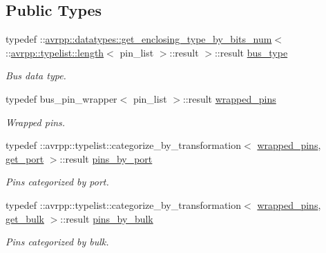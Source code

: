 \subsection*{Public Types}
\begin{DoxyCompactItemize}
\item 
typedef ::\hyperlink{structavrpp_1_1datatypes_1_1get__enclosing__type__by__bits__num}{avrpp::datatypes::get\_\-enclosing\_\-type\_\-by\_\-bits\_\-num}$<$ ::\hyperlink{structavrpp_1_1typelist_1_1length}{avrpp::typelist::length}$<$ pin\_\-list $>$::result $>$::result \hyperlink{structavrpp_1_1bus_1_1output__bus_a02bf22de8447c8097a3c77e0f896a3b4}{bus\_\-type}
\begin{DoxyCompactList}\small\item\em Bus data type. \item\end{DoxyCompactList}\item 
typedef bus\_\-pin\_\-wrapper$<$ pin\_\-list $>$::result \hyperlink{structavrpp_1_1bus_1_1output__bus_a80cbab4a94f1c05bf8e0f133a59a7fbb}{wrapped\_\-pins}
\begin{DoxyCompactList}\small\item\em Wrapped pins. \item\end{DoxyCompactList}\item 
typedef ::avrpp::typelist::categorize\_\-by\_\-transformation$<$ \hyperlink{structavrpp_1_1bus_1_1output__bus_a80cbab4a94f1c05bf8e0f133a59a7fbb}{wrapped\_\-pins}, \hyperlink{structavrpp_1_1bus_1_1get__port}{get\_\-port} $>$::result \hyperlink{structavrpp_1_1bus_1_1output__bus_a799be6ff173156ae47c7f4e8725f790f}{pins\_\-by\_\-port}
\begin{DoxyCompactList}\small\item\em Pins categorized by port. \item\end{DoxyCompactList}\item 
typedef ::avrpp::typelist::categorize\_\-by\_\-transformation$<$ \hyperlink{structavrpp_1_1bus_1_1output__bus_a80cbab4a94f1c05bf8e0f133a59a7fbb}{wrapped\_\-pins}, \hyperlink{structavrpp_1_1bus_1_1get__bulk}{get\_\-bulk} $>$::result \hyperlink{structavrpp_1_1bus_1_1output__bus_ac2d226d9ce0a1eb0c678469b49799286}{pins\_\-by\_\-bulk}
\begin{DoxyCompactList}\small\item\em Pins categorized by bulk. \item\end{DoxyCompactList}\item 

\end{DoxyCompactItemize}
